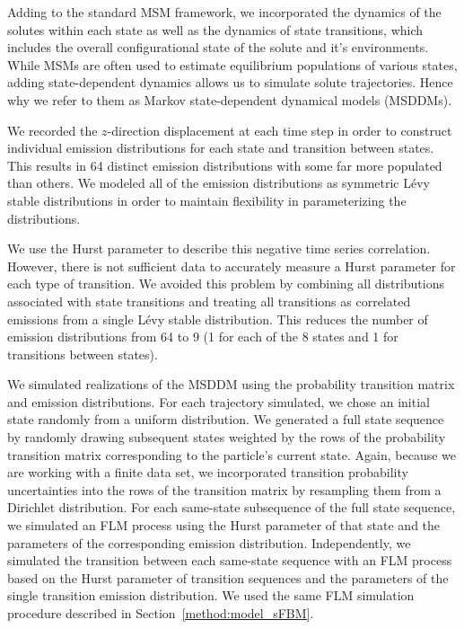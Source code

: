 \documentclass[aps,pre,preprint,groupedaddress]{revtex4-2}
\begin{document}
  Adding to the standard MSM framework, we incorporated the dynamics of the solutes
  within each state as well as the dynamics of state transitions, which includes the
  overall configurational state of the solute and it's environments. 
  While MSMs are often used to estimate equilibrium populations of various states, adding 
  state-dependent dynamics allows us to simulate solute trajectories.
  Hence why we refer to them as Markov state-dependent dynamical models (MSDDMs). 
  
  We recorded the $z$-direction displacement at each time step in order to construct 
  individual emission distributions for each state and transition between states. 
  This results in 64 distinct emission distributions with some far more populated than
  others. We modeled all of the emission distributions as symmetric L\'evy stable 
  distributions in order to maintain flexibility in parameterizing the distributions.
  
  We use the Hurst parameter to describe this negative time series correlation.
  However, there is not sufficient data to accurately measure a Hurst parameter for 
  each type of transition. We avoided this problem by combining all distributions 
  associated with state transitions and treating all transitions as correlated
  emissions from a single L\'evy stable distribution. This reduces the number of emission
  distributions from 64 to 9 (1 for each of the 8 states and 1 for transitions between states).  
  
  
  We simulated realizations of the MSDDM using the probability transition matrix and 
  emission distributions. For each trajectory simulated, we chose an initial state
  randomly from a uniform distribution. We generated a full state sequence by randomly
  drawing subsequent states weighted by the rows of the probability transition matrix
  corresponding to the particle's current state. Again, because we are working with a
  finite data set, we incorporated transition probability uncertainties into the rows
  of the transition matrix by resampling them from a Dirichlet distribution. For each 
  same-state subsequence of the full state sequence, we simulated an FLM process using
  the Hurst parameter of that state and the parameters of the corresponding emission
  distribution. Independently, we simulated the transition between each same-state 
  sequence with an FLM process based on the Hurst parameter of transition sequences 
  and the parameters of the single transition emission distribution. We used the same
  FLM simulation procedure described in Section~\ref{method:model_sFBM}.
\end{document}
